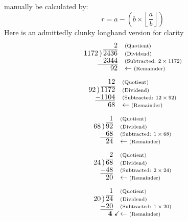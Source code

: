 \documentclass[
  letterpaper,
]{book}
\begin{document}
manually be calculated by: \[
r = a - \left( b \times \left\lfloor \dfrac{a}{b} \right\rfloor \right)
\] Here is an admittedly clunky longhand version for clarity \[
\begin{array}{r@{}l}
   2 \quad &\text{\scriptsize(Quotient)} \\[-0.2ex]
1172\,)\,\overline{2436}  \quad &\text{\scriptsize(Dividend)} \\[-0.4ex]
\underline{-2344}  \quad &\text{\scriptsize(Subtracted: $2\times1172$)} \\[-0.3ex]
\phantom{ }\,\,92 \quad &\leftarrow \text{\scriptsize(Remainder)}
\end{array}
\] \[
\begin{array}{r@{}l}
   12 \quad &\text{\scriptsize(Quotient)} \\[-0.2ex]
92\,)\,\overline{1172}  \quad &\text{\scriptsize(Dividend)} \\[-0.4ex]
\underline{-1104}  \quad &\text{\scriptsize(Subtracted: $12\times92$)} \\[-0.3ex]
\phantom{}\,\,68 \quad &\leftarrow \text{\scriptsize(Remainder)}
\end{array}
\] \[
\begin{array}{r@{}l}
   1 \quad &\text{\scriptsize(Quotient)} \\[-0.2ex]
68\,)\,\overline{92}  \quad &\text{\scriptsize(Dividend)} \\[-0.4ex]
\underline{-68}  \quad &\text{\scriptsize(Subtracted: $1\times68$)} \\[-0.3ex]
\phantom{}\,\,24 \quad &\leftarrow \text{\scriptsize(Remainder)}
\end{array}
\] \[
\begin{array}{r@{}l}
   2 \quad &\text{\scriptsize(Quotient)} \\[-0.2ex]
24\,)\,\overline{68}  \quad &\text{\scriptsize(Dividend)} \\[-0.4ex]
\underline{-48}  \quad &\text{\scriptsize(Subtracted: $2\times24$)} \\[-0.3ex]
\phantom{}\,\,20 \quad &\leftarrow \text{\scriptsize(Remainder)}
\end{array}
\] \[
\begin{array}{r@{}l}
   1 \quad &\text{\scriptsize(Quotient)} \\[-0.2ex]
20\,)\,\overline{24}  \quad &\text{\scriptsize(Dividend)} \\[-0.4ex]
\underline{-20}  \quad &\text{\scriptsize(Subtracted: $1\times20$)} \\[-0.3ex]
\phantom{}\,\,\mathbf{4} \; \boldsymbol{\checkmark} &\leftarrow \text{\scriptsize(Remainder)}

\end{array}\]
\end{document}

